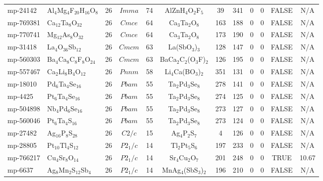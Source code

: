 {\begin{longtable}{llcccccccccc}
    mp-24142 & Al$_{4}$Mg$_{4}$F$_{20}$H$_{16}$O$_{8}$ & 26    & $Imma$ & 74    & AlZnH$_{4}$O$_{2}$F$_{5}$ & 39    & 341   & 0     & 0     & FALSE & N/A \\
    mp-769381 & Ca$_{12}$Ta$_{8}$O$_{32}$ & 26    & $Cmce$ & 64    & Ca$_{3}$Ta$_{2}$O$_{8}$ & 163   & 188   & 0     & 0     & FALSE & N/A \\
    mp-770741 & Mg$_{12}$As$_{8}$O$_{32}$ & 26    & $Cmce$ & 64    & Ca$_{3}$Ta$_{2}$O$_{8}$ & 173   & 190   & 0     & 0     & FALSE & N/A \\
    mp-31418 & La$_{4}$O$_{36}$Sb$_{12}$ & 26    & $Cmcm$ & 63    & La(SbO$_{3}$)$_{3}$ & 128   & 147   & 0     & 0     & FALSE & N/A \\
    mp-560303 & Ba$_{4}$Ca$_{8}$C$_{8}$F$_{8}$O$_{24}$ & 26    & $Cmcm$ & 63    & BaCa$_{2}$C$_{2}$(O$_{3}$F)$_{2}$ & 126   & 195   & 0     & 0     & FALSE & N/A \\
    mp-557467 & Ca$_{2}$Li$_{8}$B$_{4}$O$_{12}$ & 26    & $Pnnm$ & 58    & Li$_{4}$Ca(BO$_{3}$)$_{2}$ & 351   & 131   & 0     & 0     & FALSE & N/A \\
    mp-18010 & Pd$_{6}$Ta$_{4}$Se$_{16}$ & 26    & $Pbam$ & 55    & Ta$_{2}$Pd$_{3}$Se$_{8}$ & 278   & 141   & 0     & 0     & FALSE & N/A \\
    mp-4425 & Pt$_{6}$Ta$_{4}$Se$_{16}$ & 26    & $Pbam$ & 55    & Ta$_{2}$Pd$_{3}$Se$_{8}$ & 274   & 125   & 0     & 0     & FALSE & N/A \\
    mp-504898 & Nb$_{4}$Pd$_{6}$Se$_{16}$ & 26    & $Pbam$ & 55    & Ta$_{2}$Pd$_{3}$Se$_{8}$ & 273   & 127   & 0     & 0     & FALSE & N/A \\
    mp-560046 & Pt$_{6}$Ta$_{4}$S$_{16}$ & 26    & $Pbam$ & 55    & Ta$_{2}$Pd$_{3}$Se$_{8}$ & 273   & 124   & 0     & 0     & FALSE & N/A \\
    mp-27482 & Ag$_{16}$P$_{8}$S$_{28}$ & 26    & $C2/c$ & 15    & Ag$_{4}$P$_{2}$S$_{7}$ & 4     & 126   & 0     & 0     & FALSE & N/A \\
    mp-28805 & Pt$_{10}$Tl$_{4}$S$_{12}$ & 26    & $P2_1/c$ & 14    & Tl$_{2}$Pt$_{5}$S$_{6}$ & 197   & 233   & 0     & 0     & FALSE & N/A \\
    mp-766217 & Cu$_{4}$Sr$_{8}$O$_{14}$ & 26    & $P2_1/c$ & 14    & Sr$_{4}$Cu$_{2}$O$_{7}$ & 201   & 248   & 0     & 0     & TRUE  & 10.67  \\
    mp-6637 & Ag$_{8}$Mn$_{2}$S$_{12}$Sb$_{4}$ & 26    & $P2_1/c$ & 14    & MnAg$_{4}$(SbS$_{3}$)$_{2}$ & 196   & 210   & 0     & 0     & FALSE & N/A \\

\end{longtable}}

